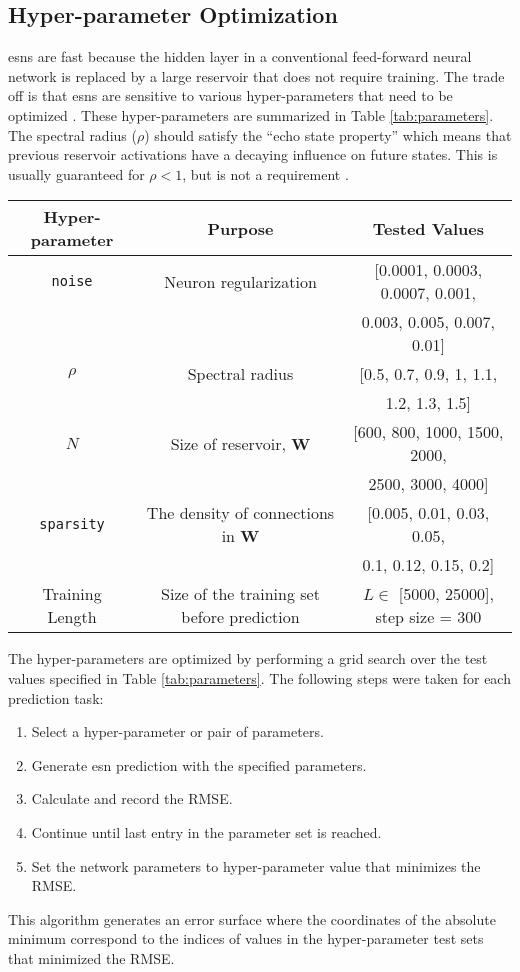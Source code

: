  \subsection{Hyper-parameter Optimization}

 \glspl{esn} are fast because the hidden layer in a conventional feed-forward neural network is replaced by a large reservoir that does not require training.
 The trade off is that \glspl{esn} are sensitive to various hyper-parameters
 that need to be optimized \cite{lukosevicius_practical_2012}. These hyper-parameters are summarized in Table \ref{tab:parameters}. The spectral radius ($\rho$) should satisfy the ``echo state property'' which means that
 previous reservoir activations have a decaying influence on future states. This
 is usually guaranteed for $\rho < 1$, but is not a requirement
 \cite{lukosevicius_practical_2012}.
 \begin{table*}[ht]
   \centering
   \caption{Description of Model Hyper-parameters}
   \label{tab:parameters}
   \begin{tabular}{c|c|c}
     \hline
     Hyper-parameter & Purpose & Tested Values\\
     \hline
     \texttt{noise} & Neuron regularization & [0.0001, 0.0003, 0.0007, 0.001, \\
     &&0.003, 0.005, 0.007, 0.01]\\
     $\rho$ & Spectral radius & [0.5, 0.7, 0.9, 1, 1.1, \\
     &&1.2, 1.3, 1.5]\\
     $N$ & Size of reservoir, \textbf{W} & [600, 800, 1000, 1500, 2000, \\
     &&2500, 3000, 4000]\\
     \texttt{sparsity} & The density of connections in \textbf{W}& [0.005, 0.01, 0.03, 0.05, \\
     &&0.1, 0.12, 0.15, 0.2]\\
     Training Length & Size of the training set before prediction & $L \in$ [5000, 25000], step size = 300
   \end{tabular}
 \end{table*}

 The hyper-parameters are optimized by performing a grid search over the test values specified in Table \ref{tab:parameters}. The following steps were taken for each prediction task:
 \begin{enumerate}
   \item Select a hyper-parameter or pair of parameters.
   \item Generate \gls{esn} prediction with the specified parameters.
   \item Calculate and record the RMSE.
   \item Continue until last entry in the parameter set is reached.
   \item Set the network parameters to hyper-parameter value that minimizes the RMSE.
 \end{enumerate}
 This algorithm generates an error surface where the coordinates of the absolute
 minimum correspond to the indices of values in the hyper-parameter test sets that minimized the RMSE.

